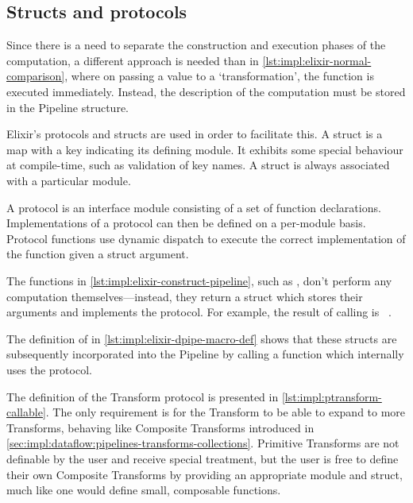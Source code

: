 \subsection{Structs and protocols}

Since there is a need to separate the construction and execution phases of the computation, a different approach is needed than in \cref{lst:impl:elixir-normal-comparison}, where on passing a value to a `transformation', the function is executed immediately.
Instead, the description of the computation must be stored in the Pipeline structure.

Elixir's protocols and structs are used in order to facilitate this.
A struct is a map with a  key indicating its defining module.
It exhibits some special behaviour at compile-time, such as validation of key names.
A struct is always associated with a particular module.

A protocol is an interface module consisting of a set of function declarations.
Implementations of a protocol can then be defined on a per-module basis.
Protocol functions use dynamic dispatch to execute the correct implementation of the function given a struct argument.

\begin{sloppypar}
The functions in \cref{lst:impl:elixir-construct-pipeline}, such as , don't perform any computation themselves---instead, they return a struct which stores their arguments and implements the  protocol.
For example, the result of calling  is \texttt{%
}.
\end{sloppypar}

The definition of \exs{~>} in \cref{lst:impl:elixir-dpipe-macro-def} shows that these structs are subsequently incorporated into the Pipeline by calling a function which internally uses the protocol.

The definition of the Transform protocol is presented in \cref{lst:impl:ptransform-callable}.
The only requirement is for the Transform to be able to expand to more Transforms, behaving like Composite Transforms introduced in \cref{sec:impl:dataflow:pipelines-transforms-collections}.
Primitive Transforms are not definable by the user and receive special treatment, but the user is free to define their own Composite Transforms by providing an appropriate module and struct, much like one would define small, composable functions.

